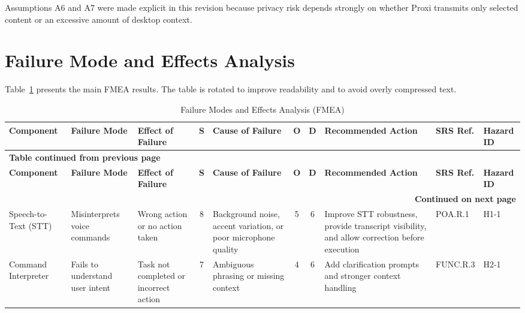\documentclass[12pt]{article}
\begin{document}
Assumptions A6 and A7 were made explicit in this revision because privacy
risk depends strongly on whether Proxi transmits only selected content or an
excessive amount of desktop context.

\section{Failure Mode and Effects Analysis}

Table~\ref{tab:fmea} presents the main FMEA results. The table is rotated to
improve readability and to avoid overly compressed text.

\clearpage
\begin{landscape}
\small
\setlength{\LTleft}{0pt}
\setlength{\LTright}{0pt}

\begin{longtable}{p{2.7cm} p{2.9cm} p{3.0cm} c p{3.2cm} c c p{4.0cm}
  p{2.2cm} p{1.5cm}}
\caption{Failure Modes and Effects Analysis (FMEA)}
\label{tab:fmea}\\
\toprule
\textbf{Component} &
\textbf{Failure Mode} &
\textbf{Effect of Failure} &
\textbf{S} &
\textbf{Cause of Failure} &
\textbf{O} &
\textbf{D} &
\textbf{Recommended Action} &
\textbf{SRS Ref.} &
\textbf{Hazard ID} \\
\midrule
\endfirsthead

\multicolumn{10}{l}{\textbf{Table \thetable{} continued from previous
page}}\\
\toprule
\textbf{Component} &
\textbf{Failure Mode} &
\textbf{Effect of Failure} &
\textbf{S} &
\textbf{Cause of Failure} &
\textbf{O} &
\textbf{D} &
\textbf{Recommended Action} &
\textbf{SRS Ref.} &
\textbf{Hazard ID} \\
\midrule
\endhead

\midrule
\multicolumn{10}{r}{\textbf{Continued on next page}}\\
\endfoot

\bottomrule
\endlastfoot

Speech-to-Text (STT) &
Misinterprets voice commands &
Wrong action or no action taken &
8 &
Background noise, accent variation, or poor microphone quality &
5 &
6 &
Improve STT robustness, provide transcript visibility, and allow
correction before execution &
POA.R.1 &
H1-1 \\

Command Interpreter &
Fails to understand user intent &
Task not completed or incorrect action &
7 &
Ambiguous phrasing or missing context &
4 &
6 &
Add clarification prompts and stronger context handling &
FUNC.R.3 &
H2-1 \\


\end{longtable}
\end{landscape}
\end{document}
